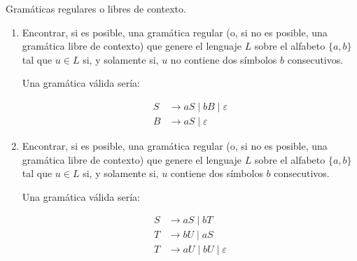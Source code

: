 \documentclass[12pt]{report} %
\begin{document}
\begin{ejercicio}
Gramáticas regulares o libres de contexto.

\begin{enumerate}[label=\alph*)]
    \item Encontrar, si es posible, una gramática regular (o, si no es posible, una gramática libre de contexto) que genere el lenguaje $L$ sobre el alfabeto $\{a, b\}$ tal que $u \in L$ si, y solamente si, $u$ no contiene dos símbolos $b$ consecutivos.

    \begin{solucion}[a)]
    Una gramática válida sería:

    \begin{align*}
        S &\to aS \mid bB \mid \varepsilon \\
        B &\to aS \mid \varepsilon
    \end{align*}
    \end{solucion}

    \item Encontrar, si es posible, una gramática regular (o, si no es posible, una gramática libre de contexto) que genere el lenguaje $L$ sobre el alfabeto $\{a, b\}$ tal que $u \in L$ si, y solamente si, $u$ contiene dos símbolos $b$ consecutivos.

    \begin{solucion}[b)]
    Una gramática válida sería:

    \begin{align*}
        S &\to aS \mid bT \\
        T &\to bU \mid aS \\
        T &\to aU \mid bU \mid \varepsilon \\
    \end{align*}
    \end{solucion}
\end{enumerate}
\end{ejercicio}
\end{document}
